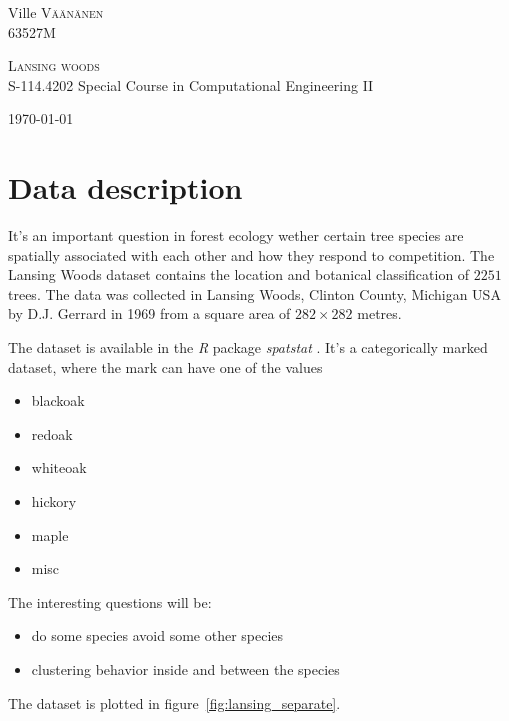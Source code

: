 \documentclass[12pt,a4paper,oneside,article]{memoir}
\author{Ville Väänänen}
\newcommand{\course}{S-114.4202}
\newcommand{\coursename}{Special Course in Computational Engineering II}
\newcommand{\studentid}{63527M}
\renewcommand{\title}{Lansing woods}
\begin{document}
\begin{titlingpage}
	\begin{center}
	\begin{minipage}{\textwidth}
	\begin{flushright} \large
	Ville \textsc{Väänänen}\\
	\studentid
	\end{flushright}
	\end{minipage}
	
	\vspace{8.0cm}
	\textsc{\LARGE \title}
	\HRule \\[0.19cm]
	{\large \course\: \coursename}
	
	
	\vfill
	\today
	\end{center}
\end{titlingpage}
\clearpage

\section{Data description}
It's an important question in forest ecology wether
certain tree species are spatially associated with each other
and how they respond to competition.
The Lansing Woods dataset \cite{lansing} contains the location and 
botanical classification of $2251$ trees. The data
was collected in Lansing Woods, Clinton County, Michigan USA by D.J.
Gerrard in 1969 from a square area of $282\times282$ metres.

The dataset is available in the \emph{R} package \emph{spatstat} \cite{R,spatstat}.
It's a categorically marked dataset, where the mark can have one of the values

\begin{itemize}
  \item blackoak
  \item redoak
  \item whiteoak
  \item hickory
  \item maple
  \item misc
\end{itemize}  

The interesting questions will be:
\begin{itemize}
  \item do some species avoid some other species
  \item clustering behavior inside and between the species
\end{itemize}
The dataset is plotted in figure~\ref{fig:lansing_separate}. 
\end{document}

